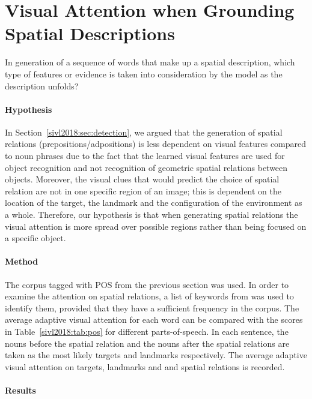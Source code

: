 \section{Visual Attention when Grounding Spatial Descriptions}\label{sivl2018:sec:grounding}

In generation of a sequence of words that make up a spatial description, which type of features or evidence is taken into consideration by the model as the description unfolds?

\paragraph{Hypothesis}
In Section~\ref{sivl2018:sec:detection}, we argued that the generation of spatial relations (prepositions/adpositions) is less dependent on visual features compared to noun phrases due to the fact that the learned visual features are used for object recognition and not recognition of geometric spatial relations between objects. Moreover, the visual clues that would predict the choice of spatial relation are not in one specific region of an image; this is dependent on the location of the target, the landmark and the configuration of the environment as a whole. Therefore, our hypothesis is that when generating spatial relations the visual attention is more spread over possible regions rather than being focused on a specific object.

\paragraph{Method}
The corpus tagged with POS from the previous section was used. In order to
examine the attention on spatial relations, a list of keywords from
\cite{herskovits1986language,Landau:1993aa} was used to identify them, provided that
they have a sufficient frequency in the corpus. The average adaptive visual
attention for each word can be compared with the scores in Table~\ref{sivl2018:tab:pos}
for different parts-of-speech. In each sentence, the nouns before the spatial
relation and the nouns after the spatial relations are taken as the most likely
targets and landmarks respectively.
The average adaptive visual attention on targets, landmarks and
and spatial relations is recorded.

\paragraph{Results}

